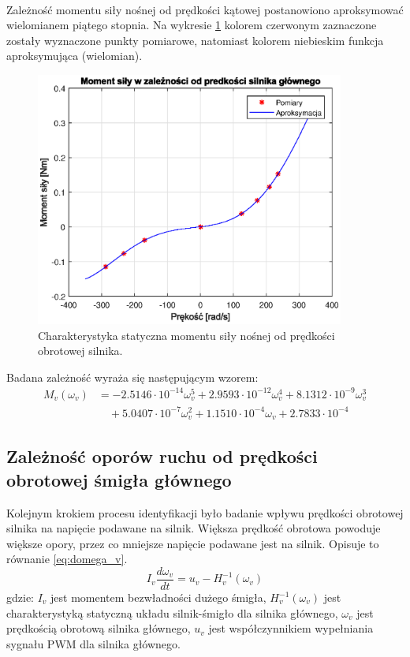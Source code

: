 \documentclass[11pt,a4paper]{article}
\begin{document}
\paragraph*{}
Zależność momentu siły nośnej od prędkości kątowej postanowiono aproksymować wielomianem piątego stopnia. Na wykresie \ref{fig:char_M_V} kolorem czerwonym zaznaczone zostały wyznaczone punkty pomiarowe, natomiast kolorem niebieskim funkcja aproksymująca (wielomian).

\begin{figure}[h]
	\centering
	\includegraphics[width=4in]{Figures/char_M_V.eps}
	\caption{Charakterystyka statyczna momentu siły nośnej od prędkości obrotowej silnika.}
	\label{fig:char_M_V}
\end{figure}

Badana zależność wyraża się następującym wzorem:
\begin{equation}
\begin{aligned}
M_v(\omega_v) &= -2.5146\cdot 10^{-14}\omega_v^5+2.9593\cdot 10^{-12}\omega_v^4+8.1312\cdot 10^{-9}\omega_v^3\\ & \quad +5.0407\cdot 10^{-7}\omega_v^2+1.1510\cdot 10^{-4}\omega_v+2.7833\cdot 10^{-4}
\end{aligned}
\end{equation}

\subsection{Zależność oporów ruchu od prędkości obrotowej śmigła głównego}
Kolejnym krokiem procesu identyfikacji było badanie wpływu prędkości obrotowej silnika na napięcie podawane na silnik. Większa prędkość obrotowa powoduje większe opory, przez co mniejsze napięcie podawane jest na silnik. Opisuje to równanie \eqref{eq:domega_v}.
\begin{equation}
I_v\frac{d\omega_v}{dt} = u_v - H_v^{-1}(\omega_v)
\label{eq:domega_v}
\end{equation}
\noindent gdzie:\newline
\(I_v\) jest momentem bezwładności dużego śmigła,\newline
\(H_v^{-1}(\omega_v)\) jest charakterystyką statyczną układu silnik-śmigło dla silnika głównego,\newline
\(\omega_v\) jest prędkością obrotową silnika głównego,\newline
\(u_v\) jest współczynnikiem wypełniania sygnału PWM dla silnika głównego.
\end{document}
